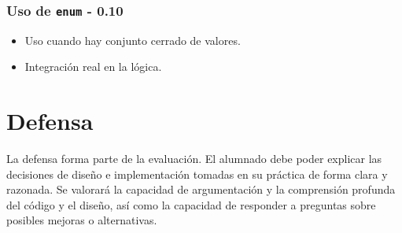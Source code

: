 \documentclass[10pt,a4paper]{article}
\begin{document}
\subsubsection{Uso de \texttt{enum} - 0.10}
\begin{itemize}
    \item Uso cuando hay conjunto cerrado de valores.
    \item Integración real en la lógica.
\end{itemize}

\section{Defensa}
La defensa forma parte de la evaluación. El alumnado debe poder explicar las decisiones de diseño e implementación tomadas en su práctica de forma clara y razonada. Se valorará la capacidad de argumentación y la comprensión profunda del código y el diseño, así como la capacidad de responder a preguntas sobre posibles mejoras o alternativas.
\end{document}
